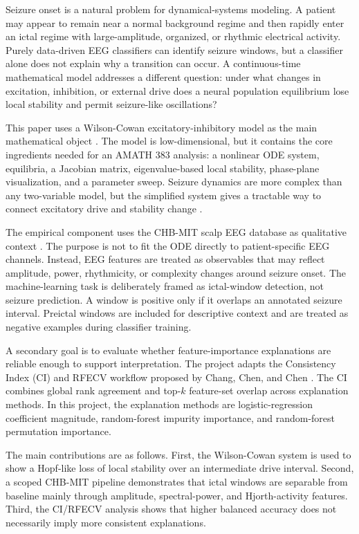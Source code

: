 \documentclass[11pt]{article}
\begin{document}
Seizure onset is a natural problem for dynamical-systems modeling. A patient may appear to remain near a normal background regime and then rapidly enter an ictal regime with large-amplitude, organized, or rhythmic electrical activity. Purely data-driven EEG classifiers can identify seizure windows, but a classifier alone does not explain why a transition can occur. A continuous-time mathematical model addresses a different question: under what changes in excitation, inhibition, or external drive does a neural population equilibrium lose local stability and permit seizure-like oscillations?

This paper uses a Wilson-Cowan excitatory-inhibitory model as the main mathematical object \cite{wilson1972}. The model is low-dimensional, but it contains the core ingredients needed for an AMATH 383 analysis: a nonlinear ODE system, equilibria, a Jacobian matrix, eigenvalue-based local stability, phase-plane visualization, and a parameter sweep. Seizure dynamics are more complex than any two-variable model, but the simplified system gives a tractable way to connect excitatory drive and stability change \cite{jirsa2014}.

The empirical component uses the CHB-MIT scalp EEG database as qualitative context \cite{chbmit,shoeb2009}. The purpose is not to fit the ODE directly to patient-specific EEG channels. Instead, EEG features are treated as observables that may reflect amplitude, power, rhythmicity, or complexity changes around seizure onset. The machine-learning task is deliberately framed as ictal-window detection, not seizure prediction. A window is positive only if it overlaps an annotated seizure interval. Preictal windows are included for descriptive context and are treated as negative examples during classifier training.

A secondary goal is to evaluate whether feature-importance explanations are reliable enough to support interpretation. The project adapts the Consistency Index (CI) and RFECV workflow proposed by Chang, Chen, and Chen \cite{chang2026}. The CI combines global rank agreement and top-$k$ feature-set overlap across explanation methods. In this project, the explanation methods are logistic-regression coefficient magnitude, random-forest impurity importance, and random-forest permutation importance.

The main contributions are as follows. First, the Wilson-Cowan system is used to show a Hopf-like loss of local stability over an intermediate drive interval. Second, a scoped CHB-MIT pipeline demonstrates that ictal windows are separable from baseline mainly through amplitude, spectral-power, and Hjorth-activity features. Third, the CI/RFECV analysis shows that higher balanced accuracy does not necessarily imply more consistent explanations.
\end{document}
